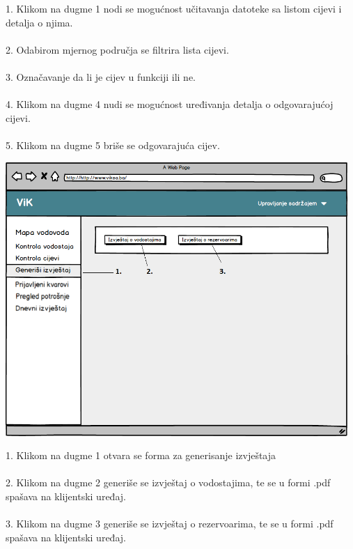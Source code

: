 \documentclass[]{report}
\begin{document}
1. Klikom na dugme 1 nodi se mogućnost učitavanja datoteke sa listom cijevi i detalja o njima.
\\
\\
2. Odabirom mjernog područja se filtrira lista cijevi.
\\
\\
3. Označavanje da li je cijev u funkciji ili ne.
\\
\\
4. Klikom na dugme 4 nudi se mogućnost uređivanja detalja o odgovarajućoj cijevi.
\\
\\
5. Klikom na dugme 5 briše se odgovarajuća cijev.

\begin{center}
\includegraphics[width=13cm]{UI1.png}
\end{center}

1. Klikom na dugme 1 otvara se forma za generisanje izvještaja
\\\\2. Klikom na dugme 2 generiše se izvještaj o vodostajima, te se u formi .pdf spašava na klijentski uređaj.
\\\\3. Klikom na dugme 3 generiše se izvještaj o rezervoarima, te se u formi .pdf spašava na klijentski uređaj.
\end{document}

